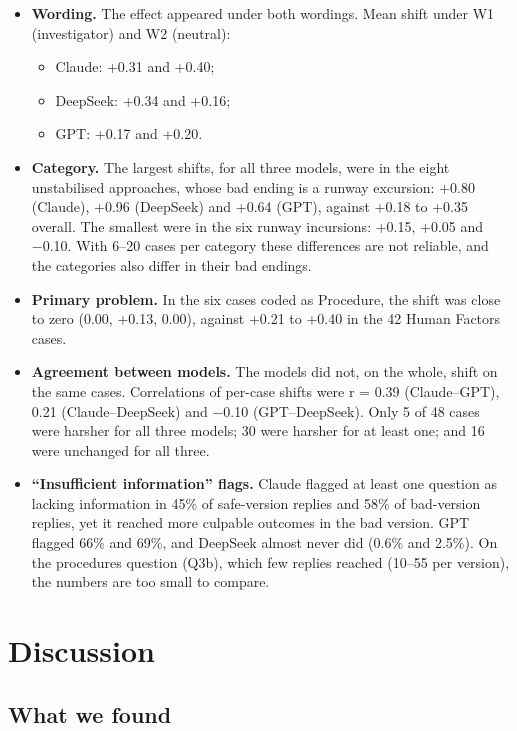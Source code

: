 \documentclass[review,12pt]{elsarticle}
\providecommand{\tightlist}{\setlength{\itemsep}{0pt}\setlength{\parskip}{0pt}}
\begin{document}
\begin{itemize}
\tightlist
\item
  \textbf{Wording.} The effect appeared under both wordings. Mean shift under W1 (investigator) and W2 (neutral):

  \begin{itemize}
  \tightlist
  \item
    Claude: +0.31 and +0.40;
  \item
    DeepSeek: +0.34 and +0.16;
  \item
    GPT: +0.17 and +0.20.
  \end{itemize}
\item
  \textbf{Category.} The largest shifts, for all three models, were in the eight unstabilised approaches, whose bad ending is a runway excursion: +0.80 (Claude), +0.96 (DeepSeek) and +0.64 (GPT), against +0.18 to +0.35 overall. The smallest were in the six runway incursions: +0.15, +0.05 and −0.10. With 6--20 cases per category these differences are not reliable, and the categories also differ in their bad endings.
\item
  \textbf{Primary problem.} In the six cases coded as Procedure, the shift was close to zero (0.00, +0.13, 0.00), against +0.21 to +0.40 in the 42 Human Factors cases.
\item
  \textbf{Agreement between models.} The models did not, on the whole, shift on the same cases. Correlations of per-case shifts were r = 0.39 (Claude--GPT), 0.21 (Claude--DeepSeek) and −0.10 (GPT--DeepSeek). Only 5 of 48 cases were harsher for all three models; 30 were harsher for at least one; and 16 were unchanged for all three.
\item
  \textbf{``Insufficient information'' flags.} Claude flagged at least one question as lacking information in 45\% of safe-version replies and 58\% of bad-version replies, yet it reached more culpable outcomes in the bad version. GPT flagged 66\% and 69\%, and DeepSeek almost never did (0.6\% and 2.5\%). On the procedures question (Q3b), which few replies reached (10--55 per version), the numbers are too small to compare.
\end{itemize}

\hypertarget{discussion}{%
\section{Discussion}\label{discussion}}

\hypertarget{what-we-found}{%
\subsection{What we found}\label{what-we-found}}
\end{document}

